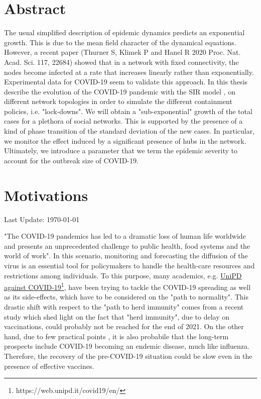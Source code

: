 \documentclass[a4paper,10pt, oneside]{book} %
\theoremstyle{definition}
\begin{document}
	


\restoregeometry
\chapter{Abstract}
The usual simplified description of epidemic dynamics predicts an exponential growth. This is due to the mean field character of the dynamical equations. However, a recent paper (Thurner S, Klimek P and Hanel R 2020 Proc. Nat. Acad. Sci. 117, 22684) \cite{Thurner::NetBasedExpl} showed that in a network with fixed connectivity, the nodes become infected at a rate that increases linearly rather than exponentially.
Experimental data for COVID-19 seem to validate this approach. In this thesis describe the evolution of the COVID-19 pandemic with the SIR model \cite{pizzuti::2020_ItalyCOVIDnetwork}, on different network topologies in order to simulate the different containment policies, i.e. "lock-downs". We will obtain a "sub-exponential" growth of the total cases for a plethora of social networks. This is supported by the presence of a kind of phase transition of the standard deviation of the new cases. In particular, we monitor the effect induced by a significant presence of hubs in the network.
Ultimately, we introduce a parameter that we term the epidemic severity to account for the outbreak size of COVID-19.

\chapter{Motivations}
Last Update: \today

"The COVID-19 pandemics has led to a dramatic loss of human life worldwide and presents an unprecedented challenge to public health, food systems and the world of work"\cite{Chriscaden::2021_ImpactCOVID19}. In this scenario, monitoring and forecasting the diffusion of the virus is an essential tool for policymakers to handle the health-care resources and restrictions among individuals. To this purpose, many academics, e.g. \href{https://web.unipd.it/covid19/en/}{UniPD against COVID-19}\footnote{https://web.unipd.it/covid19/en/}, have been trying to tackle the COVID-19 spreading as well as its side-effects, which have to be considered on the "path to normality". This drastic shift with respect to the "path to herd immunity" comes from a recent study \cite{GU::2021_SitePathToNormality} which shed light on the fact that "herd immunity", due to delay on vaccinations, could probably not be reached for the end of 2021. On the other hand, due to few practical points \cite{Nature:18.3.2021_NoHerdImmunity}, it is also probabile that the long-term prospects include COVID-19 becoming an endemic disease, much like influenza. 
Therefore, the recovery of the pre-COVID-19 situation could be slow even in the presence of effective vaccines.
\end{document}
